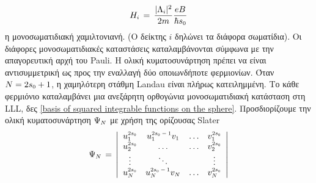 \begin{equation*}
    H\subscr{i}\,=\,\frac{|\Lambda\subscr{i}|^2}{2m}\frac{eB}{\hbar s\subscr{0}}
\end{equation*}
η μονοσωματιδιακή χαμιλτονιανή.
(Ο δείκτης $i$ δηλώνει τα διάφορα σωματίδια).
Οι διάφορες μονοσωματιδιακές καταστάσεις καταλαμβάνονται σύμφωνα με την απαγορευτική αρχή του Pauli. Η ολική κυματοσυνάρτηση πρέπει να είναι αντισυμμετρική ως προς την εναλλαγή δύο οποιωνδήποτε φερμιονίων.
Όταν $N=2s\subscr{0}+1$, η χαμηλότερη στάθμη Landau είναι πλήρως κατειλημμένη. 
Το κάθε φερμιόνιο καταλαμβάνει μια ανεξάρητη ορθογώνια μονοσωματιδιακή κατάσταση στη LLL, δες \eqref{basis of squared integrable functions on the sphere}.  
Προσδιορίζουμε την ολική κυματοσυνάρτηση $\Psi\subscr{N}$ 
με χρήση της ορίζουσας Slater
\begin{equation}\label{slater determinant}
\Psi\subscr{N}\,=\,\left|\begin{array}{cccc}
    u\subscr{1}\superscr{2s\subscr{0}} & u\subscr{1}\superscr{2s\subscr{0}-1}v\subscr{1} &\dots & v\subscr{1}\superscr{2s\subscr{0}} \\
    u\subscr{2}\superscr{2s\subscr{0}} & \dots & \dots & v\subscr{2}\superscr{2s\subscr{0}} \\
    \vdots & \ddots & & \vdots\\
    u\subscr{N}\superscr{2s\subscr{0}} & u\subscr{N}\superscr{2s\subscr{0}-1}v\subscr{N} &\dots & v\subscr{N}\superscr{2s\subscr{0}}
\end{array}\right|
\end{equation}
